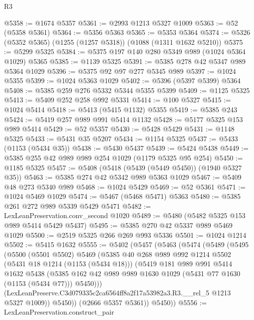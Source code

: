 \begin{lexlean}{R3}
\begin{coremodule}
@5358 := @1674 @5357
@5361 := @2993 @1213 @5327 @1009
@5363 := @52 (@5358 @5361)
@5364 := @5356 @5363
@5365 := @5353 @5364
@5374 := @5326 (@5352 @5365) (@1255 (@1257 @5318)) (@1088 (@1311 @1632 @5210))
@5375 := @5299 @5325
@5384 := @5375 @197 @140 @280 @5349 @989 (@1024 @5364 @1029) @5365
@5385 := @1139 @5325
@5391 := @5385 @278 @42 @5347 @989 @5364 @1029
@5396 := @5375 @92 @97 @277 @5345 @989
@5397 := @1024 @5355
@5399 := @1024 @5363 @1029
@5402 := @5396 (@5397 @5399) @5364
@5408 := @5385 @259 @276 @5332 @5344 @5355 @5399
@5409 := @1125 @5325
@5413 := @5409 @252 @258 @992 @5331
@5414 := @100 @5327
@5415 := @1024 @5414
@5418 := @5413 (@5415 @1132) @5355
@5419 := @5385 @243
@5424 := @5419 @257 @989 @991 @5414 @1132
@5428 := @5177 @5325 @153 @989 @5414
@5429 := @52 @5357
@5430 := @5428 @5429
@5431 := @1148 @5325
@5433 := @5431 @35 @5207
@5434 := @1154 @5325
@5437 := @5433 (@1153 (@5434 @35))
@5438 := @5430 @5437
@5439 := @5424 @5438
@5449 := @5385 @255 @42 @989 @989 @254 @1029 (@1179 @5325 @95 @254)
@5450 := @1185 @5325
@5457 := @5408 (@5418 (@5439 (@5449 @5450)) (@1940 @5327 @35))
@5463 := @5385 @274 @42 @5342 @989 @5363 @1029
@5467 := @5409 @48 @273 @5340 @989
@5468 := @1024 @5429
@5469 := @52 @5361
@5471 := @1024 @5469 @1029
@5474 := @5467 (@5468 @5471) @5363
@5480 := @5385 @261 @272 @989 @5339 @5429 @5471
@5482 := LexLeanPreservation.conv_second @1020
@5489 := @5480 (@5482 @5325 @153 @989 @5414 @5429 @5437)
@5495 := @5385 @270 @42 @5337 @989 @5469 @1029
@5500 := @2519 @5325 @266 @269 @993 @5336
@5501 := @1024 @1214
@5502 := @5415 @1632
@5555 := @5402
    (@5457
      (@5463
        (@5474
          (@5489
            (@5495
              (@5500
                (@5501 @5502)
                @5469
                (@5385
                  @40
                  @268
                  @989
                  @992
                  @1214
                  @5502
                  (@5431 @18 @1214 (@1153 (@5434 @18)))
                  (@5419
                    @181
                    @989
                    @991
                    @5414
                    @1632
                    @5438
                    (@5385
                      @162
                      @42
                      @989
                      @989
                      @1630
                      @1029
                      (@5431 @77 @1630 (@1153 (@5434 @77)))
                      @5450)))
                (LexLeanPreserve.C3d079335c2ca6564ff8a2f17a53982a3.R3.__rel_5 @1213 @5327 @1009))
              @5450))
          (@2666 @5357 @5361))
        @5450))
@5556 := LexLeanPreservation.construct_pair

\end{coremodule}
\end{lexlean}
